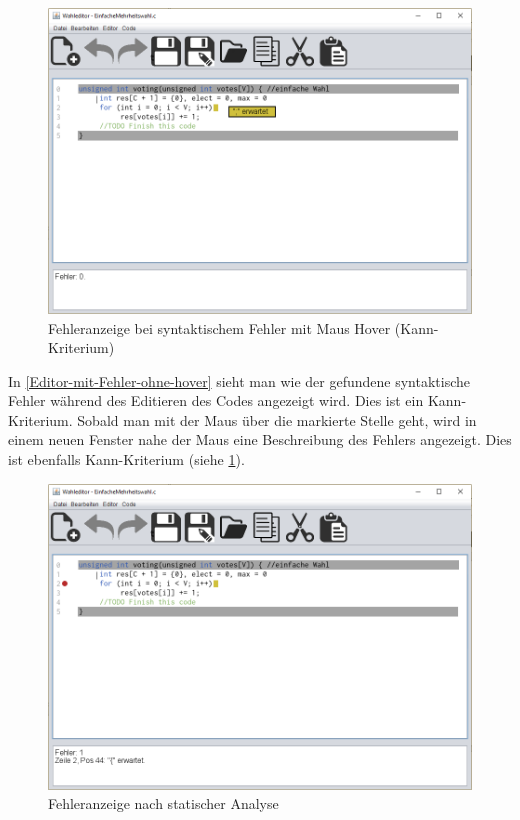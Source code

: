 \documentclass[a4paper]{scrreprt}
\begin{document}
\begin{figure}[H]
\includegraphics[scale=0.5]{Editor-mit-Fehler-mit-hover.png}
\caption{Fehleranzeige bei syntaktischem Fehler mit Maus Hover (Kann-Kriterium)}
\label{Editor-mit-Fehler-mit-hover}
\end{figure}

In \ref{Editor-mit-Fehler-ohne-hover} sieht man wie der gefundene syntaktische Fehler während des Editieren des Codes angezeigt wird. Dies ist ein Kann-Kriterium. Sobald man mit der Maus über die markierte Stelle geht, wird in einem neuen Fenster nahe der Maus eine Beschreibung des Fehlers angezeigt. Dies ist ebenfalls Kann-Kriterium (siehe \ref{Editor-mit-Fehler-mit-hover}).

\begin{figure}[H]
\includegraphics[scale=0.5]{Editor-mit-Fehler-nach-statischer-analyse.png}
\caption{Fehleranzeige nach statischer Analyse}
\label{Editor-mit-Fehler-nach-statischer-analyse}
\end{figure}
\end{document}
